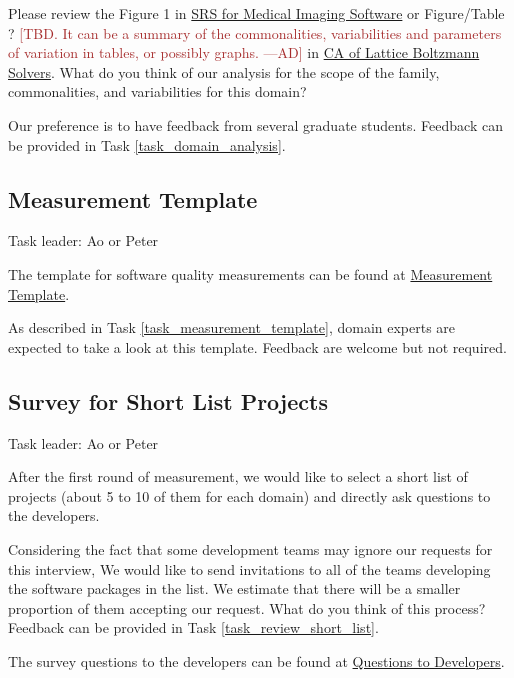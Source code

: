 \documentclass[12pt]{article}
\newcommand{\authornote}[3]{\textcolor{#1}{[#3 ---#2]}}
\newcommand{\authornote}[3]{}
\newcommand{\ad}[1]{\authornote{brown}{AD}{#1}} %
\begin{document}
Please review the Figure 1 in \href{https://github.com/Ao99/MISEG/blob/master/docs/SRS/SRS.pdf}{SRS for
Medical Imaging Software} or Figure/Table ? \ad{TBD. It can be a summary of the
commonalities, variabilities and parameters of variation in tables, or possibly
graphs.} in
\href{https://github.com/peter-michalski/LatticeBoltzmannSolvers/blob/master/docs/SRS/CA.pdf}{CA
of Lattice Boltzmann Solvers}.
What do you think of our analysis for the scope of the family, commonalities, and variabilities  for this domain?

Our preference is to have feedback from several graduate students. Feedback can be provided in Task \ref{task_domain_analysis}.

\subsection{Measurement Template}
\label{measurement_template}
Task leader: Ao or Peter

The template for software quality measurements can be found at
\href{https://github.com/smiths/AIMSS/blob/master/StateOfPractice/Combined_MeasurementTemplate_EmpiricalMeasures.xlsx}{Measurement
	Template}.

As described in Task \ref{task_measurement_template}, domain experts are
expected to take a look at this template. Feedback are welcome but not required.

\subsection{Survey for Short List Projects}
\label{survey_short_list_projects}
Task leader: Ao or Peter

After the first round of measurement, we would like to select a short list of
projects (about 5 to 10 of them for each domain) and directly ask questions to the
developers.

Considering the fact that some development teams may ignore our requests for
this interview, We would like to send invitations to all of the teams developing
the software packages in the list. We estimate that there will be a smaller
proportion of them accepting our request. What do you think of
this process? Feedback can be provided in Task \ref{task_review_short_list}.

The survey questions to the developers can be found at
\href{https://github.com/smiths/AIMSS/blob/master/StateOfPractice/Methodology/Questions%20to%20Developers.pdf}{Questions
	to Developers}.
\end{document}
